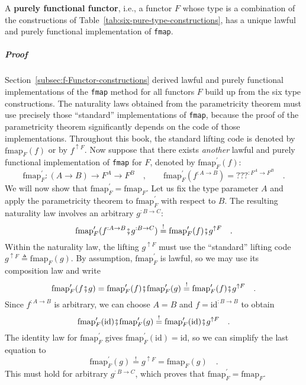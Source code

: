 A \textbf{purely functional functor},
i.e., a functor $F$ whose type is a combination of the constructions
of Table~\ref{tab:six-pure-type-constructions}, has a unique lawful
and purely functional implementation of \lstinline!fmap!. 

\subparagraph{Proof}

Section~\ref{subsec:f-Functor-constructions} derived lawful and
purely functional implementations of the \lstinline!fmap! method
for all functors $F$ build up from the six type constructions. The
naturality laws obtained from the parametricity theorem must use precisely
those \textsf{``}standard\textsf{''} implementations of \lstinline!fmap!, because
the proof of the parametricity theorem significantly depends on the
code of those implementations. Throughout this book, the standard
lifting code is denoted by $\text{fmap}_{F}(f)$ or by $f^{\uparrow F}$.
Now suppose that there exists \emph{another} lawful and purely functional
implementation of \lstinline!fmap! for $F$, denoted by $\text{fmap}_{F}^{\prime}(f)$:
\[
\text{fmap}_{F}^{\prime}:\left(A\rightarrow B\right)\rightarrow F^{A}\rightarrow F^{B}\quad,\quad\quad\text{fmap}_{F}^{\prime}(f^{:A\rightarrow B})=\text{???}^{:F^{A}\rightarrow F^{B}}\quad.
\]
We will now show that $\text{fmap}_{F}^{\prime}=\text{fmap}_{F}$.
Let us fix the type parameter $A$ and apply the parametricity theorem
to $\text{fmap}_{F}^{\prime}$ with respect to $B$. The resulting
naturality law involves an arbitrary $g^{:B\rightarrow C}$:
\[
\text{fmap}_{F}^{\prime}(f^{:A\rightarrow B}\bef g^{:B\rightarrow C})\overset{!}{=}\text{fmap}_{F}^{\prime}(f)\bef g^{\uparrow F}\quad.
\]
Within the naturality law, the lifting $g^{\uparrow F}$ must use
the \textsf{``}standard\textsf{''} lifting code $g^{\uparrow F}\triangleq\text{fmap}_{F}(g)$.
By assumption, $\text{fmap}_{F}^{\prime}$ is lawful, so we may use
its composition law and write
\[
\text{fmap}_{F}^{\prime}(f\bef g)=\text{fmap}_{F}^{\prime}(f)\bef\text{fmap}_{F}^{\prime}(g)\overset{!}{=}\text{fmap}_{F}^{\prime}(f)\bef g^{\uparrow F}\quad.
\]
Since $f^{:A\rightarrow B}$ is arbitrary, we can choose $A=B$ and
$f=\text{id}^{:B\rightarrow B}$ to obtain
\[
\text{fmap}_{F}^{\prime}(\text{id})\bef\text{fmap}_{F}^{\prime}(g)\overset{!}{=}\text{fmap}_{F}^{\prime}(\text{id})\bef g^{\uparrow F}\quad.
\]
The identity law for $\text{fmap}_{F}^{\prime}$ gives $\text{fmap}_{F}^{\prime}(\text{id})=\text{id}$,
so we can simplify the last equation to
\[
\text{fmap}_{F}^{\prime}(g)\overset{!}{=}g^{\uparrow F}=\text{fmap}_{F}(g)\quad.
\]
This must hold for arbitrary $g^{:B\rightarrow C}$, which proves
that $\text{fmap}_{F}^{\prime}=\text{fmap}_{F}$.

